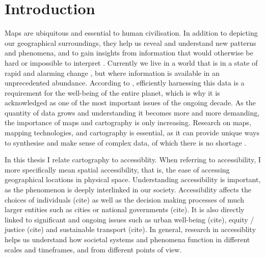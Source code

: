\section{Introduction}



Maps are ubiquitous and essential to human civilisation.
In addition to depicting our geographical surroundings,
they help us reveal and understand new patterns and phenomena,
and to gain insights from information
that would otherwise be hard or impossible to interpret \parencite{mac2004}.
Currently we live in a world that is in a state of rapid and
alarming change \parencite{un2023},
but where information is available in an unprecedented abundance.
According to \textcite{un2020}, efficiently harnessing this data
is a requirement for the well-being of the entire planet,
which is why it is acknowledged as
one of the most important issues of the ongoing decade.
As the quantity of data grows
and understanding it becomes more and more demanding,
the importance of maps and cartography is only increasing.
Research on maps, mapping technologies, and cartography is essential,
as it can provide unique ways to synthesise and make sense of complex data,
of which there is no shortage \parencite{kra2021}.



In this thesis I relate cartography to accessiblity.
When referring to accessibility,
I more specifically mean spatial accessibility,
that is, the ease of accessing geographical locations in physical space.
Understanding accessibility is important,
as the phenomenon is deeply interlinked in our society.
Accessibility affects the choices of individuals (cite)
as well as the decision making processes of much larger entities
such as cities or national governments (cite).
It is also directly linked to significant and ongoing issues such as
urban well-being (cite),
equity / justice (cite)
and sustainable transport (cite).
In general, research in accessiblity helps us understand
how societal systems and phenomena function in different
scales and timeframes, and from different points of view.

